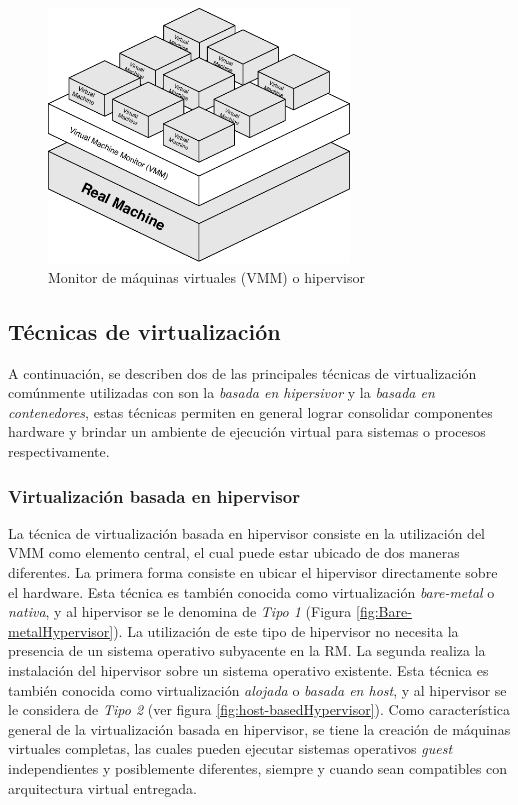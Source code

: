 \begin{figure}[!hbtp]
	\centering
	\includegraphics[width=8cm]{Pictures/VMMGeneric.pdf}
	\vspace{-0.2cm}
	\caption{Monitor de máquinas virtuales (VMM) o hipervisor}
	\label{fig:VMM}
\end{figure}

\subsection{Técnicas de virtualización}

A continuación, se describen dos de las principales técnicas de virtualización comúnmente utilizadas con son la \textit{basada en hipersivor} y la \textit{basada en contenedores}, estas técnicas permiten en general lograr consolidar componentes hardware y brindar un ambiente de ejecución virtual para sistemas o procesos respectivamente.

\subsubsection{Virtualización basada en hipervisor}

La técnica de virtualización basada en hipervisor consiste en la utilización del VMM como elemento central, el cual puede estar ubicado de dos maneras diferentes. La primera forma consiste en ubicar el hipervisor directamente sobre el hardware. Esta técnica es también conocida como virtualización \textit{bare-metal} o \textit{nativa}, y al hipervisor se le denomina de \textit{Tipo 1} (Figura \ref{fig:Bare-metalHypervisor}).  La utilización de este tipo de hipervisor no necesita la presencia de un sistema operativo subyacente en la RM. La segunda realiza la instalación del hipervisor sobre un sistema operativo existente. Esta técnica es también conocida como virtualización \textit{alojada} o \textit{basada en host}, y al hipervisor se le considera de \textit{Tipo 2} (ver figura \ref{fig:host-basedHypervisor}). Como característica general de la virtualización basada en hipervisor, se tiene la creación de máquinas virtuales completas, las cuales pueden ejecutar sistemas operativos \textit{guest} independientes y posiblemente diferentes, siempre y cuando sean compatibles con arquitectura virtual entregada. 


